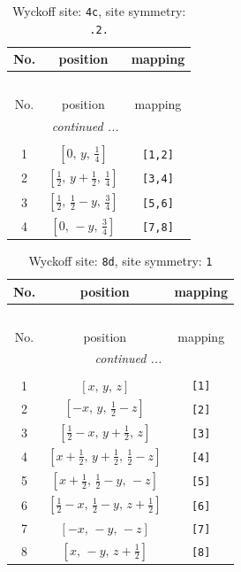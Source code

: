 \documentclass[fleqn,8pt]{jsarticle}
\begin{document}
\renewcommand{\arraystretch}{1.2}
\begin{longtable}{ccc}
\caption{Wyckoff site: {\tt 4c}, site symmetry: {\tt .2.}}
 \\
 \hline \hline
No. & position & mapping \\ \hline \endfirsthead

\multicolumn{2}{l}{\tablename\ \thetable{}} \\
 \hline \hline
No. & position & mapping \\ \hline \endhead

 \hline \hline
\multicolumn{2}{r}{\footnotesize\it continued ...} \\ \endfoot

 \hline \hline
\multicolumn{2}{r}{} \\ \endlastfoot

1 & $\left[ 0,\, y,\, \frac{1}{4} \right]$ & {\tt [1,2]} \\ \hline
2 & $\left[ \frac{1}{2},\, y + \frac{1}{2},\, \frac{1}{4} \right]$ & {\tt [3,4]} \\ \hline
3 & $\left[ \frac{1}{2},\, \frac{1}{2} - y,\, \frac{3}{4} \right]$ & {\tt [5,6]} \\ \hline
4 & $\left[ 0,\, - y,\, \frac{3}{4} \right]$ & {\tt [7,8]} \\
\end{longtable}
\renewcommand{\arraystretch}{1.2}
\begin{longtable}{ccc}
\caption{Wyckoff site: {\tt 8d}, site symmetry: {\tt 1}}
 \\
 \hline \hline
No. & position & mapping \\ \hline \endfirsthead

\multicolumn{2}{l}{\tablename\ \thetable{}} \\
 \hline \hline
No. & position & mapping \\ \hline \endhead

 \hline \hline
\multicolumn{2}{r}{\footnotesize\it continued ...} \\ \endfoot

 \hline \hline
\multicolumn{2}{r}{} \\ \endlastfoot

1 & $\left[ x,\, y,\, z \right]$ & {\tt [1]} \\ \hline
2 & $\left[ - x,\, y,\, \frac{1}{2} - z \right]$ & {\tt [2]} \\ \hline
3 & $\left[ \frac{1}{2} - x,\, y + \frac{1}{2},\, z \right]$ & {\tt [3]} \\ \hline
4 & $\left[ x + \frac{1}{2},\, y + \frac{1}{2},\, \frac{1}{2} - z \right]$ & {\tt [4]} \\ \hline
5 & $\left[ x + \frac{1}{2},\, \frac{1}{2} - y,\, - z \right]$ & {\tt [5]} \\ \hline
6 & $\left[ \frac{1}{2} - x,\, \frac{1}{2} - y,\, z + \frac{1}{2} \right]$ & {\tt [6]} \\ \hline
7 & $\left[ - x,\, - y,\, - z \right]$ & {\tt [7]} \\ \hline
8 & $\left[ x,\, - y,\, z + \frac{1}{2} \right]$ & {\tt [8]} \\
\end{longtable}
\end{document}
